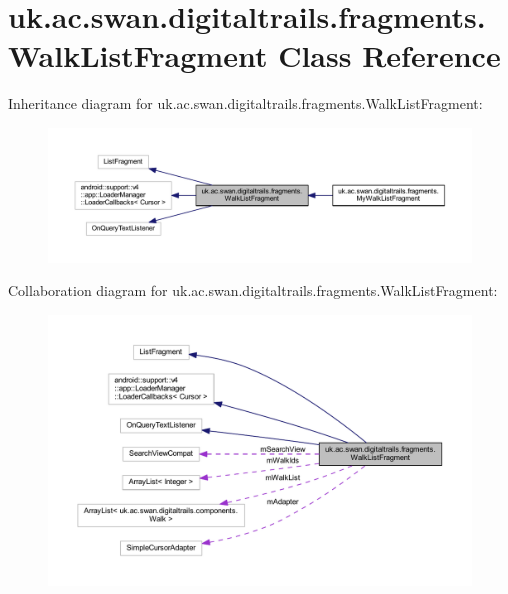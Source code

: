 \hypertarget{classuk_1_1ac_1_1swan_1_1digitaltrails_1_1fragments_1_1_walk_list_fragment}{\section{uk.\+ac.\+swan.\+digitaltrails.\+fragments.\+Walk\+List\+Fragment Class Reference}
\label{classuk_1_1ac_1_1swan_1_1digitaltrails_1_1fragments_1_1_walk_list_fragment}
}


Inheritance diagram for uk.\+ac.\+swan.\+digitaltrails.\+fragments.\+Walk\+List\+Fragment\+:\nopagebreak
\begin{figure}[H]
\begin{center}
\leavevmode
\includegraphics[width=350pt]{classuk_1_1ac_1_1swan_1_1digitaltrails_1_1fragments_1_1_walk_list_fragment__inherit__graph}
\end{center}
\end{figure}


Collaboration diagram for uk.\+ac.\+swan.\+digitaltrails.\+fragments.\+Walk\+List\+Fragment\+:\nopagebreak
\begin{figure}[H]
\begin{center}
\leavevmode
\includegraphics[width=350pt]{classuk_1_1ac_1_1swan_1_1digitaltrails_1_1fragments_1_1_walk_list_fragment__coll__graph}
\end{center}
\end{figure}
